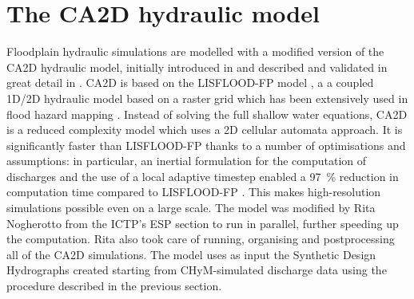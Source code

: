 \section{The CA2D hydraulic model}\label{sec:ca2d}
Floodplain hydraulic simulations are modelled with a modified version of the CA2D hydraulic model, initially introduced in \citet{Dottori2010} and described and validated in great detail in \citet{Dottori2011}.
CA2D is based on the LISFLOOD-FP model \citep{Bates2005}, a a coupled 1D/2D hydraulic model based on a raster grid which has been extensively used in flood hazard mapping \citep[see e.g.][]{ThomasStevenSavage2016, Neal2011, Skinner2015}. Instead of solving the full shallow water equations, CA2D is a reduced complexity model which uses a 2D cellular automata approach.
It is significantly faster than LISFLOOD-FP thanks to a number of optimisations and assumptions: in particular, an inertial formulation \citep{Bates2010}
for the computation of discharges and the use of a local adaptive timestep \citep{Zhang1994} enabled a \SI{97}{\%} reduction in computation time compared to LISFLOOD-FP \citep{Dottori2011}.
This makes high-resolution simulations possible even on a large scale.
The model was modified by Rita Nogherotto from the ICTP's ESP section to run in parallel, further speeding up the computation. Rita also took care of running, organising and postprocessing all of the CA2D simulations.
The model uses as input the Synthetic Design Hydrographs created starting from CHyM-simulated discharge data using the procedure described in the previous section.

